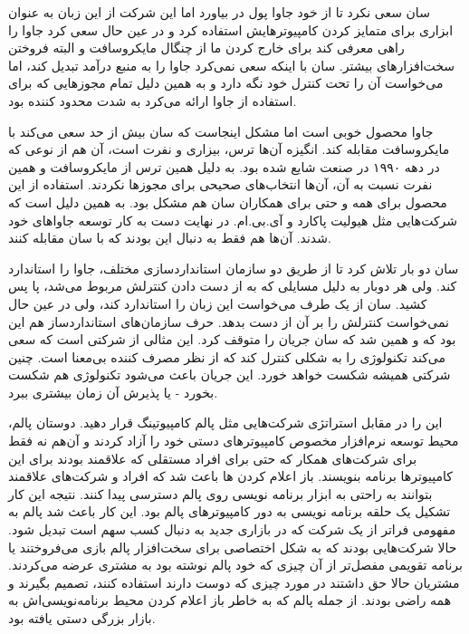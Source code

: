 سان سعی نکرد تا از خود جاوا پول در بیاورد اما این شرکت از این زبان به عنوان ابزاری برای متمایز کردن کامپیوترهایش استفاده کرد و در عین حال سعی کرد جاوا را راهی معرفی کند برای خارج کردن ما از چنگال مایکروسافت و البته فروختن سخت‌افزارهای بیشتر. سان با اینکه سعی نمی‌کرد جاوا را به منبع درآمد تبدیل کند، اما می‌خواست آن را تحت کنترل خود نگه دارد و به همین دلیل تمام مجوزهایی که برای استفاده از جاوا ارائه می‌کرد به شدت محدود کننده بود. 

جاوا محصول خوبی است اما مشکل اینجاست که سان بیش از حد سعی می‌کند با
مایکروسافت مقابله کند. انگیزه آن‌ها ترس، بیزاری و نفرت است، آن هم از
نوعی که در دهه ۱۹۹۰ در صنعت شایع شده بود. به دلیل همین ترس از
مایکروسافت و همین نفرت نسبت به آن، آن‌ها انتخاب‌های صحیحی برای مجوزها
نکردند. استفاده از این محصول برای همه و حتی برای همکاران سان هم مشکل
بود. به همین دلیل است که شرکت‌هایی مثل هیولیت پاکارد و آی.بی.ام. در نهایت دست به کار توسعه جاواهای خود
شدند. آن‌ها هم فقط به دنبال این بودند که با سان مقابله کنند.

سان دو بار تلاش کرد تا از طریق دو سازمان استانداردسازی مختلف، جاوا را
استاندارد کند. ولی هر دوبار به دلیل مسایلی که به از دست دادن کنترلش
مربوط می‌شد،‌ پا پس کشید. سان از یک طرف می‌خواست این زبان را استاندارد
کند، ولی در عین حال نمی‌خواست کنترلش را بر آن از دست بدهد. حرف
سازمان‌های استانداردساز هم این بود که  و همین شد که سان جریان را
متوقف کرد. این مثالی از شرکتی است که سعی می‌کند تکنولوژی را به شکلی
کنترل کند که از نظر مصرف کننده بی‌معنا است. چنین شرکتی همیشه شکست خواهد
خورد. این جریان باعث می‌شود تکنولوژی هم شکست بخورد - یا پذیرش آن زمان
بیشتری ببرد.

این را در مقابل استراتژی 
شرکت‌هایی مثل پالم کامپیوتینگ قرار دهید. دوستان پالم، محیط توسعه نرم‌افزار مخصوص
کامپیوترهای دستی خود را آزاد کردند و آن‌هم نه فقط برای شرکت‌های همکار که
حتی برای افراد مستقلی که علاقمند بودند برای این کامپیوترها برنامه
بنویسند. باز اعلام کردن ها باعث شد که افراد و شرکت‌های علاقمند
بتوانند به راحتی به ابزار برنامه نویسی روی پالم دسترسی پیدا
کنند. نتیجه این کار تشکیل یک حلقه برنامه نویسی به دور کامپیوترهای پالم
بود. این کار باعث شد پالم به مفهومی فراتر از یک شرکت که در بازاری جدید
به دنبال کسب سهم است تبدیل شود. حالا شرکت‌هایی بودند که به شکل اختصاصی
برای سخت‌افزار پالم بازی می‌فروختند یا برنامه تقویمی مفصل‌تر از آن چیزی
که خود پالم نوشته بود به مشتری عرضه می‌کردند. مشتریان حالا حق داشتند در
مورد چیزی که دوست دارند استفاده کنند، تصمیم بگیرند و همه راضی
بودند. از جمله پالم که به خاطر باز اعلام کردن محیط برنامه‌نویسی‌اش به
بازار بزرگی دستی یافته بود.

